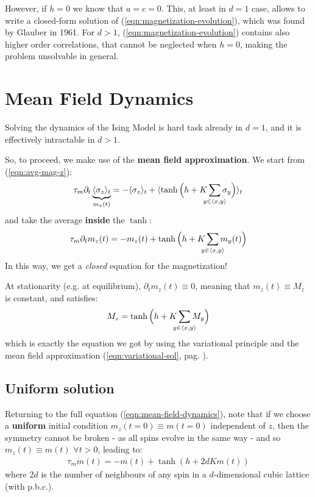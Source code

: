 \documentclass[../../main.tex]{subfiles}
\begin{document}
However, if $h=0$ we know that $a = c = 0$. This, at least in $d=1$ case, allows to write a closed-form solution of (\ref{eqn:magnetization-evolution}), which was found by Glauber in 1961. For $d > 1$, (\ref{eqn:magnetization-evolution}) contains also higher order correlations, that cannot be neglected when $h=0$, making the problem unsolvable in general.

\section{Mean Field Dynamics}
Solving the dynamics of the Ising Model is hard task already in $d=1$, and it is effectively intractable in $d > 1$. 

So, to proceed, we make use of the \textbf{mean field approximation}. We start from (\ref{eqn:avg-mag-z}):
\begin{align*}
    \tau_m \partial_t \underbrace{\langle \sigma_z \rangle_t}_{m_z(t)}  = - \langle \sigma_z \rangle_t + \langle \tanh \Big(h + K \sum_{\mathclap{y \in \langle x,y \rangle}} \sigma_y \Big)  \rangle_t
\end{align*}
and take the average \textbf{inside} the $\tanh$:
\begin{align}\label{eqn:mean-field-dynamics}
    \tau_m \partial_t m_z(t) = -m_z(t) + \tanh \Big(h + K \sum_{\mathclap{y \in \langle x,y \rangle}} m_y(t) \Big)
\end{align} 
In this way, we get a \textit{closed} equation for the magnetization!

\medskip

At stationarity (e.g. at equilibrium), $\partial_t m_z(t) \equiv 0$, meaning that $m_z(t) \equiv M_z$ is constant, and satisfies:
\begin{align*}
    M_z = \tanh \Big( h + K \sum_{\mathclap{y \in \langle x,y \rangle}} M_y\Big)
\end{align*}
which is exactly the equation we got by using the variational principle and the mean field approximation (\ref{eqn:variational-sol}, pag. \pageref{eqn:variational-sol}). 

\subsection{Uniform solution}

Returning to the full equation (\ref{eqn:mean-field-dynamics}), note that if we choose a \textbf{uniform} initial condition $m_z(t=0) \equiv m(t=0)$ independent of $z$, then the symmetry cannot be broken - as all spins evolve in the same way - and so $m_z(t) \equiv m(t)$ $\forall t > 0$, leading to:
\begin{align}\label{eqn:uniform-evolution}
    \tau_m \dot{m}(t) = -m(t) + \tanh(h + 2dKm(t))
\end{align} 
where $2d$ is the number of neighbours of any spin in a $d$-dimensional cubic lattice (with p.b.c.).
\end{document}
